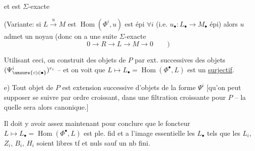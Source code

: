 et est $\Sigma$-exacte

(Variante: si $L\xrightarrow{u}M$ est    $\operatorname{Hom}(\Phi^i,u)$ est épi $\forall i$ (i.e. $u_{\bullet}:L_{\bullet}\longrightarrow M_{\bullet}$ épi) alors $u$  admet un noyau (donc on a une suite $\Sigma$-exacte
\[
0\longrightarrow R\longrightarrow L\longrightarrow M\longrightarrow0\qquad)
\]

Utilisant ceci, on construit des objets de $P$ par ext. successives des objets $(\Psi_{\unsure{\varepsilon|i|\bullet}}^i)^{r_i}$ -- et on voit que $L\longmapsto L_{\bullet}=\operatorname{Hom}(\Phi^{\bullet},L)$ est un \uline{surjectif}.

e) Tout objet  de $P$ est extension successive d'objets de la forme $\Psi^i$ [qu'on peut supposer se suivre par ordre croissant, dans une filtration croissante  pour $P$ -- la quelle sera alors canonique.]

Il doit y avoir assez maintenant pour conclure que le foncteur $L\longmapsto L_{\bullet}=\operatorname{Hom}(\Phi^{\bullet},L)$ est ple. fid et a l'image essentielle les $L_{\bullet}$ tels que les $L_i$, $Z_i$, $B_i$, $H_i$ soient libres tf et  nuls sauf un nb fini.
